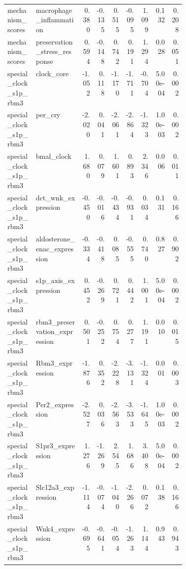 \documentclass[11pt]{article}
\begin{document}
\begin{landscape}
\begin{longtable}{p{0.16\linewidth}p{0.26\linewidth}rrrrrrr}
mechanism\_scores & macrophage\_inflammation & 0.380 & -0.135 & 0.515 & -0.095 & 1.099 & 0.132 & 0.208 \\
mechanism\_scores & preservation\_stress\_response & 0.594 & -0.148 & 0.742 & 0.191 & 1.294 & 0.028 & 0.051 \\
special\_clock\_s1p\_rbm3 & clock\_core & -1.052 & 0.118 & -1.170 & -1.711 & -0.704 & 5.00e-04 & 0.002 \\
special\_clock\_s1p\_rbm3 & per\_cry & -2.020 & 0.041 & -2.061 & -2.864 & -1.323 & 1.00e-03 & 0.002 \\
special\_clock\_s1p\_rbm3 & bmal\_clock & 1.680 & 0.079 & 1.601 & 0.893 & 2.346 & 0.006 & 0.011 \\
special\_clock\_s1p\_rbm3 & dct\_wnk\_expression & -0.450 & -0.016 & -0.434 & -0.931 & 0.034 & 0.131 & 0.166 \\
special\_clock\_s1p\_rbm3 & aldosterone\_enac\_expression & -0.334 & -0.418 & 0.085 & -0.555 & 0.740 & 0.827 & 0.902 \\
special\_clock\_s1p\_rbm3 & s1p\_axis\_expression & 0.452 & -0.269 & 0.721 & 0.442 & 1.001 & 5.00e-04 & 0.002 \\
special\_clock\_s1p\_rbm3 & rbm3\_preservation\_expression & 0.501 & -0.252 & 0.754 & 0.277 & 1.191 & 0.010 & 0.015 \\
special\_clock\_s1p\_rbm3 & Rbm3\_expression & -1.876 & 0.352 & -2.228 & -3.131 & -1.324 & 0.001 & 0.003 \\
special\_clock\_s1p\_rbm3 & Per2\_expression & -2.527 & 0.036 & -2.563 & -3.533 & -1.645 & 1.00e-03 & 0.002 \\
special\_clock\_s1p\_rbm3 & S1pr3\_expression & 1.276 & -1.269 & 2.545 & 1.686 & 3.408 & 5.00e-04 & 0.002 \\
special\_clock\_s1p\_rbm3 & Slc12a3\_expression & -1.114 & -0.074 & -1.040 & -2.266 & 0.072 & 0.138 & 0.166 \\
special\_clock\_s1p\_rbm3 & Wnk4\_expression & -0.695 & -0.641 & -0.054 & -1.263 & 1.144 & 0.943 & 0.943 \\
\bottomrule
\end{longtable}
\normalsize
\end{landscape}
\end{document}
